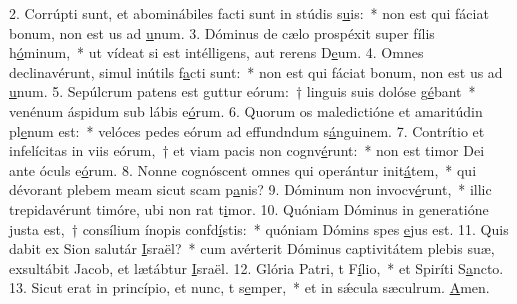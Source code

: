 2. Corrúpti sunt, et abominábiles facti sunt in stúdis s\uline{u}is:~* non est qui fáciat bonum, non est us ad \uline{u}num.
3. Dóminus de cælo prospéxit super fílis h\uline{ó}minum,~* ut vídeat si est intélligens, aut rerens D\uline{e}um.
4. Omnes declinavérunt, simul inútils f\uline{a}cti sunt:~* non est qui fáciat bonum, non est us ad \uline{u}num.
5. Sepúlcrum patens est guttur eórum:~† linguis suis dolóse g\uline{é}bant~* venénum áspidum sub lábis e\uline{ó}rum.
6. Quorum os maledictióne et amaritúdin pl\uline{e}num est:~* velóces pedes eórum ad effundndum s\uline{á}nguinem.
7. Contrítio et infelícitas in viis eórum,~† et viam pacis non cognv\uline{é}runt:~* non est timor Dei ante óculs e\uline{ó}rum.
8. Nonne cognóscent omnes qui operántur init\uline{á}tem,~* qui dévorant plebem meam sicut scam p\uline{a}nis?
9. Dóminum non invocv\uline{é}runt,~* illic trepidavérunt timóre, ubi non rat t\uline{i}mor.
10. Quóniam Dóminus in generatióne justa est,~† consílium ínopis confd\uline{í}stis:~* quóniam Dómins spes \uline{e}jus est.
11. Quis dabit ex Sion salutár \uline{I}sraël?~* cum avérterit Dóminus captivitátem plebis suæ, exsultábit Jacob, et lætábtur \uline{I}sraël.
12. Glória Patri, t F\uline{í}lio,~* et Spiríti S\uline{a}ncto.
13. Sicut erat in princípio, et nunc, t s\uline{e}mper,~* et in sǽcula sæculrum. \uline{A}men.
